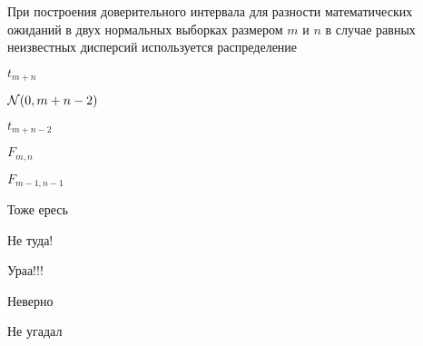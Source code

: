 
\begin{question}
При построения доверительного интервала для разности математических
ожиданий в двух нормальных выборках размером \(m\) и \(n\) в случае
равных неизвестных дисперсий используется распределение
\begin{answerlist}
  \item \(t_{m+n}\)
  \item \(\mathcal{N}(0, m+n-2)\)
  \item \(t_{m+n-2}\)
  \item \(F_{m,n}\)
  \item \(F_{m-1, n-1}\)
\end{answerlist}
\end{question}

\begin{solution}
\begin{answerlist}
  \item Тоже ересь
  \item Не туда!
  \item Ураа!!!
  \item Неверно
  \item Не угадал
\end{answerlist}
\end{solution}

